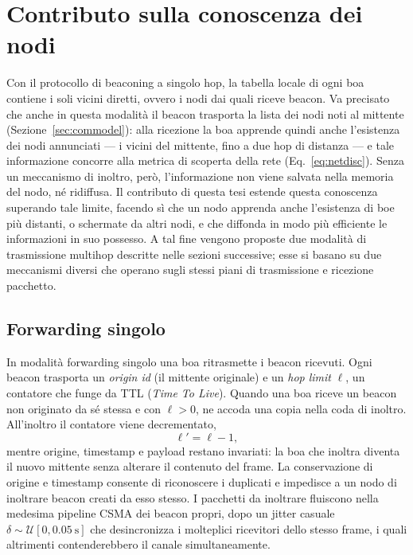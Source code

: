 \section{Contributo sulla conoscenza dei nodi}
\label{sec:multihop}
Con il protocollo di beaconing a singolo hop, la tabella locale di ogni boa 
contiene i soli vicini diretti, ovvero i nodi dai quali riceve beacon.
Va precisato che anche in questa modalit\`a il beacon trasporta la lista dei nodi noti al
mittente (Sezione~\ref{sec:commodel}): alla ricezione la boa apprende quindi anche
l'esistenza dei nodi annunciati --- i vicini del mittente, fino a due hop di distanza ---
e tale informazione concorre alla metrica di scoperta della rete (Eq.~\ref{eq:netdisc}).
Senza un meccanismo di inoltro, per\`o, l'informazione non viene salvata nella memoria del nodo, n\'e ridiffusa. 
Il contributo di questa tesi estende questa conoscenza superando tale limite, facendo s\`i
che un nodo apprenda anche l'esistenza di boe pi\`u distanti, o schermate da altri nodi, e che diffonda in modo pi\`u efficiente le informazioni in
suo possesso. A tal fine vengono proposte due modalit\`a di trasmissione multihop descritte nelle
sezioni successive; esse si basano su due meccanismi diversi che operano sugli stessi piani di trasmissione e ricezione pacchetto.

\subsection{Forwarding singolo}
\label{sec:forward}
In modalit\`a forwarding singolo una boa ritrasmette i beacon ricevuti. Ogni beacon trasporta un
\emph{origin id} (il mittente originale) e un \emph{hop limit} $\ell$, un contatore che funge da TTL (\emph{Time To Live}). 
Quando una boa riceve un beacon non originato da s\'e stessa e con $\ell > 0$, 
ne accoda una copia nella coda di inoltro. All'inoltro il contatore viene decrementato,
\begin{equation}
  \ell' = \ell - 1,
  \label{eq:ttl}
\end{equation}
mentre origine, timestamp e payload restano invariati: la boa che inoltra diventa il
nuovo mittente senza alterare il contenuto del frame. La conservazione di origine e
timestamp consente di riconoscere i duplicati e impedisce a un nodo di inoltrare beacon
creati da esso stesso. I pacchetti da inoltrare fluiscono nella medesima pipeline CSMA dei beacon
propri, dopo un jitter casuale $\delta \sim \mathcal{U}[0, \SI{0.05}{\second}]$ che
desincronizza i molteplici ricevitori dello stesso frame, i quali altrimenti
contenderebbero il canale simultaneamente. 

